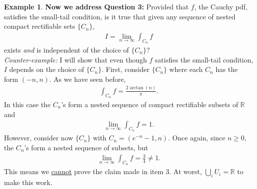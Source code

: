 \documentclass{article}
\theoremstyle{definition}
\newtheorem{exmp}{Example}[section]
\begin{document}
\begin{exmp}
\noindent \textbf{Now we address Question 3:} Provided that $f$, the Cauchy pdf, satisfies the  small-tail condition, is it true that given any sequence of nested compact rectifiable sets $\{ C_n\}$,
\begin{align*}
    I = \lim\limits_{n\to \infty} \int_{C_n}f
\end{align*}
exists \textit{and} is independent of the choice of $\{C_n\}$? \\



\textit{Counter-example:} I will show that even though $f$ satisfies the small-tail condition, $I$ depends on the choice of $\{C_n\}$. First, consider $\{C_n\}$ where each $C_n$ has the form $(-n,n)$. As we have seen before,
\begin{align*}
    \int_{C_n}f = \frac{2\arctan(n)}{\pi}.
\end{align*}
In this case the $C_n$'s form a nested sequence of compact rectifiable subsets of $\mathbb{R}$ and 
\begin{align*}
    \lim_{n\to\infty}\int_{C_n}f =1.    
\end{align*}
However, consider now $\{C_n\}$ with $C_n = (e^{-n} - 1, n)$. Once again, since $n\geq 0$, the $C_n$'s form a nested sequence of subsets, but
\begin{align*}
    \lim_{n\to \infty}\int_{C_n}f = \frac{3}{4} \neq 1.
\end{align*}
This means we \underline{cannot} prove the claim made in item 3. At worst, $\bigcup_i U_i = \mathbb{R}$ to make this work.


\end{exmp}
\end{document}
